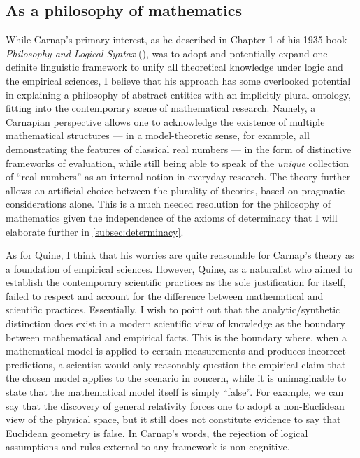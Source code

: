 \documentclass[12pt]{article}
\theoremstyle{plain}
\theoremstyle{definition}
\begin{document}
\subsection{As a philosophy of mathematics}

While Carnap's primary interest, as he described in Chapter 1 of his 1935 book \emph{Philosophy and Logical Syntax} (\cite{carnap-pls}), was to adopt and potentially expand one definite linguistic framework to unify all theoretical knowledge under logic and the empirical sciences, I believe that his approach has some overlooked potential in explaining a philosophy of abstract entities with an implicitly plural ontology, fitting into the contemporary scene of mathematical research. Namely, a Carnapian perspective allows one to acknowledge the existence of multiple mathematical structures --- in a model-theoretic sense, for example, all demonstrating the features of classical real numbers --- in the form of distinctive frameworks of evaluation, while still being able to speak of the \emph{unique} collection of ``real numbers'' as an internal notion in everyday research. The theory further allows an artificial choice between the plurality of theories, based on pragmatic considerations alone. This is a much needed resolution for the philosophy of mathematics given the independence of the axioms of determinacy that I will elaborate further in \autoref{subsec:determinacy}.

As for Quine, I think that his worries are quite reasonable for Carnap's theory as a foundation of empirical sciences. However, Quine, as a naturalist who aimed to establish the contemporary scientific practices as the sole justification for itself, failed to respect and account for the difference between mathematical and scientific practices. Essentially, I wish to point out that the analytic/synthetic distinction does exist in a modern scientific view of knowledge as the boundary between mathematical and empirical facts. This is the boundary where, when a mathematical model is applied to certain measurements and produces incorrect predictions, a scientist would only reasonably question the empirical claim that the chosen model applies to the scenario in concern, while it is unimaginable to state that the mathematical model itself is simply ``false''. For example, we can say that the discovery of general relativity forces one to adopt a non-Euclidean view of the physical space, but it still does not constitute evidence to say that Euclidean geometry is false. In Carnap's words, the rejection of logical assumptions and rules external to any framework is non-cognitive.
\end{document}
